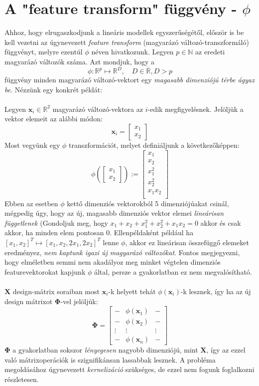 \documentclass[14p]{report}
\def\pmb{\boldsymbol}
\def\bar{\overline}
\newcounter{x}
\newcounter{y}
\newcounter{z}
\begin{document}
	\section{A "feature transform" függvény - $\phi$}
	Ahhoz, hogy elrugaszkodjunk a lineáris modellek egyszerűségétől, először is be kell vezetni az úgynevezett \emph{feature transform} (magyarázó változó-transzformáló) függvényt, melyre ezentúl $\phi$ néven hivatkozunk. Legyen $p \in \mathbb{N}$ az eredeti magyarázó változók száma. Azt mondjuk, hogy a 
	\[
		\phi : \mathbb{R}^{p} \mapsto \mathbb{R}^{D}, \quad D \in \bar{\mathbb{R}}, D > p 
	\]
	függvény minden magyarázó változó-vektort egy \emph{magasabb dimenziójú térbe ágyaz be}. Nézzünk egy konkrét példát:
	\\
	\\
	Legyen $\pmb{x}_i \in \mathbb{R}^{2}$ magyarázó változó-vektora az $i$-edik megfigyelésnek. Jelöljük a vektor elemeit az alábbi módon:
	\[
		\pmb{x}_i =
		\begin{bmatrix}
			x_1 \\
			x_2
		\end{bmatrix}	
	\]
	Most vegyünk egy $\phi$ transzformációt, melyet definiáljunk a következőképpen:
	\[
		\phi\left(
		\begin{bmatrix}
			x_1 \\
			x_2
		\end{bmatrix}	
		\right) := 
		\begin{bmatrix}
			x_1 \\
			x_2 \\
			x^2_1 \\
			x^2_2 \\
			x_1 x_2 \\
		\end{bmatrix}
	\]
	Ebben az esetben $\phi$ kettő dimenziós vektorokból 5 dimenziójúakat csinál, mégpedig úgy, hogy az új, magasabb dimenziós vektor elemei \emph{lineárisan függetlenek} (Gondoljuk meg, hogy $x_1 + x_2 + x^2_1 + x^2_2 + x_1 x_2 = 0$ akkor és csak akkor, ha minden elem pontosan $0$. Ellenpéldaként például ha $[x_1, x_2]^T \mapsto [x_1, x_2, 2x_1, 2x_2]^T$ lenne $\phi$, akkor ez lineárisan összefüggő elemeket eredményez, \emph{nem kaptunk igazi új magyarázó változókat}. Fontos megjegyezni, hogy elméletben semmi nem akadályoz meg minket végtelen dimenziós featurevektorokat kapjunk $\phi$ által, persze a gyakorlatban ez nem megvalósítható.
	\\
	\\
	$\pmb{X}$ design-mátrix soraiban most $\pmb{x}_i$-k helyett tehát $\phi(\pmb{x}_i)$-k lesznek, így ha az új design mátrixot $\pmb{\Phi}$-vel jelöljük:
	\[
		\pmb{\Phi} = 
		\begin{bmatrix}
			 - & \phi(\pmb{x}_1) & - \\
			 - & \phi(\pmb{x}_2) & - \\
			 \vdots & \vdots & \vdots \\
			 - & \phi(\pmb{x}_n) & -
		\end{bmatrix}
	\]
	$\pmb{\Phi}$ a gyakorlatban sokszor \emph{lényegesen} nagyobb dimenziójú, mint $\pmb{X}$, így az ezzel való mátrixoperációk is szignifikánsan lassabbak lesznek. A probléma megoldásához úgynevezett \emph{kernelizáció} szükséges, de ezzel nem fogunk foglalkozni részletesen.
	 
\end{document}
